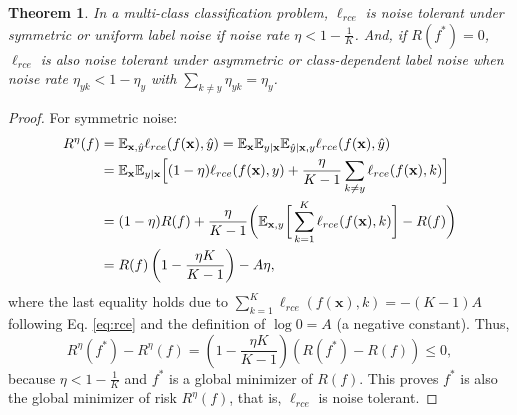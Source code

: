 \documentclass[10pt,twocolumn,letterpaper]{article}
\newtheorem{theorem}{Theorem}
\newcommand{\E}{\mathbb{E}}
\def \xx {\mathbf{x}}
\begin{document}
\begin{theorem}
In a multi-class classification problem, $\ell_{rce}$ is noise tolerant under symmetric or uniform label noise if noise rate $\eta < 1 -\frac{1}{K}$. And, if $R(f^*) = 0$, $\ell_{rce}$ is also noise tolerant under asymmetric or class-dependent label noise when noise rate $\eta_{y k} < 1-\eta_{y}$ with $\sum_{k \neq y}\eta_{y k}=\eta_{y}$.
\end{theorem}
\begin{proof}
For symmetric noise:
\begin{align*}
	\small
	R^\eta(f) & =  \E_{\xx, \hat{y}} \ell_{rce}(f(\xx), \hat{y}) =  \E_{\xx} \E_{y | \xx} \E_{\hat{y} | \xx, y} \ell_{rce}(f(\xx), \hat{y}) \\
		&= \E_{\xx} \E_{y | \xx} \Big[ (1-\eta) \ell_{rce}(f(\xx), y) + \frac{\eta}{K-1} \sum_{k\neq y} \ell_{rce}(f(\xx), k) \Big] \\
		& =  (1 - \eta) R(f) +  \frac{\eta}{K-1} \bigg(\E_{\xx, y}\bigg[\sum_{k=1}^{K}\ell_{rce}(f(\xx), k)\bigg] - R(f)\bigg)\\
		& = R(f)\left(1-\frac{\eta K}{K-1}\right) - A\eta,
\end{align*}
where the last equality holds due to $\sum_{k=1}^{K}\ell_{rce}(f(\xx), k) = - (K-1)A$ following Eq. \eqref{eq:rce} and the definition of $\log 0 = A$ (a negative constant). Thus, 
	\[R^\eta(f^*)-R^\eta(f)=(1-\frac{\eta K}{K-1})(R(f^*)-R(f)) \leq 0,\]
because $\eta < 1 - \frac{1}{K}$ and $f^*$ is a global minimizer of $R(f)$. This proves $f^*$ is also the global minimizer of risk $R^\eta(f)$, that is, $\ell_{rce}$ is noise tolerant. 
	

\end{proof}
\end{document}
